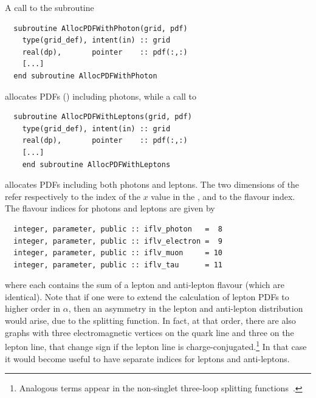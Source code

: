 A call to the subroutine
\begin{lstlisting}  
  subroutine AllocPDFWithPhoton(grid, pdf)
    type(grid_def), intent(in) :: grid
    real(dp),       pointer    :: pdf(:,:)
    [...]
  end subroutine AllocPDFWithPhoton
\end{lstlisting}
allocates PDFs () including photons, while a call to
\begin{lstlisting}  
  subroutine AllocPDFWithLeptons(grid, pdf)
    type(grid_def), intent(in) :: grid
    real(dp),       pointer    :: pdf(:,:)
    [...]
    end subroutine AllocPDFWithLeptons
\end{lstlisting}
allocates PDFs including both photons and leptons.
%
The two dimensions of the  refer respectively to
the index of the $x$ value in the , and to the flavour index.
The flavour indices for photons and leptons %
are
given by
\begin{lstlisting}  
  integer, parameter, public :: iflv_photon   =  8
  integer, parameter, public :: iflv_electron =  9
  integer, parameter, public :: iflv_muon     = 10
  integer, parameter, public :: iflv_tau      = 11
\end{lstlisting}
where each  contains the sum of a lepton and
anti-lepton flavour (which are identical). Note that if one were to
extend the calculation of lepton PDFs to higher order in $\alpha$,
then an asymmetry in the lepton and anti-lepton distribution would
arise, due to the  splitting function.
%
In fact, at that order, there are also graphs with three
electromagnetic vertices on the quark line and three on the lepton line, that change sign if the lepton line is charge-conjugated.\footnote{Analogous terms appear in the non-singlet three-loop splitting functions~\cite{NNLO-NS}.}
%
%
In that case it would become useful
to have separate indices for leptons and anti-leptons.


